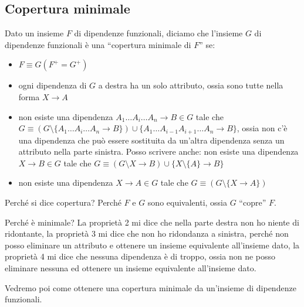 \subsection{Copertura minimale}

Dato un insieme $F$ di dipendenze funzionali, diciamo che l'insieme $G$ di dipendenze funzionali \`e una ``copertura minimale di $F$'' se:
\begin{itemize}
    \item $F \equiv G (F^+ = G^+)$
    \item ogni dipendenza di $G$ a destra ha un solo attributo, ossia sono tutte nella forma $X \to A$
    \item non esiste una dipendenza $A_1 \dots A_i \dots A_n \to B \in G$ tale che $G \equiv (G \setminus \{ A_1 \dots A_i \dots A_n \to B \}) \cup \{A_1 \dots A_{i-1} A_{i+1} \dots A_n \to B \}$, ossia non c'\`e una dipendenza che pu\`o essere sostituita da un'altra dipendenza senza un attributo nella parte sinistra. Posso scrivere anche: non esiste una dipendenza $X \to B \in G$ tale che $G \equiv (G \setminus{ X \to B}) \cup \{ X \setminus \{A\} \to B \}$
    \item non esiste una dipendenza $X \to A \in G$ tale che $G \equiv (G \setminus \{X \to A\})$
\end{itemize}

Perch\'e si dice copertura? Perch\'e $F$ e $G$ sono equivalenti, ossia $G$ ``copre'' $F$.

Perch\'e \`e minimale? La propriet\`a 2 mi dice che nella parte destra non ho niente di ridontante, la propriet\`a 3 mi dice che non ho ridondanza a sinistra, perch\'e non posso eliminare un attributo e ottenere un insieme equivalente all'insieme dato, la propriet\`a 4 mi dice che nessuna dipendenza \`e di troppo, ossia non ne posso eliminare nessuna ed ottenere un insieme equivalente all'insieme dato.

Vedremo poi come ottenere una copertura minimale da un'insieme di dipendenze funzionali.

